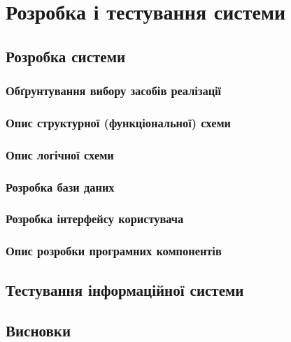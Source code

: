 \documentclass[../main.tex]{subfiles}
\begin{document}
	
\chapter{Розробка і тестування системи}
	
\section{Розробка  системи}
	
\subsection{Обґрунтування вибору засобів реалізації}

\subsection{Опис структурної (функціональної) схеми}

\subsection{Опис логічної схеми}

\subsection{Розробка бази даних}

\subsection{Розробка інтерфейсу користувача}

\subsection{Опис розробки програмних компонентів}

\section{Тестування інформаційної системи}

\section{Висновки}

	
\end{document}
